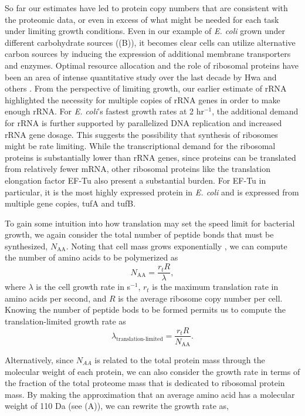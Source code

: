 So far our estimates have led to protein copy numbers that are consistent with
the proteomic data, or even in excess of what might be needed for each task
under limiting growth conditions. Even in our example of \textit{E. coli} grown
under different carbohydrate sources ((B)), it becomes clear
cells can utilize alternative carbon sources by inducing the expression of
additional membrane transporters and enzymes. Optimal resource allocation and
the role of ribosomal proteins have been an area of intense quantitative study
over the last decade by Hwa and others \citep{scott2010, hui2015}. From the
perspective of limiting growth, our earlier estimate of rRNA highlighted the
necessity for multiple copies of rRNA genes in order to make enough rRNA. For
\textit{E. coli}'s fastest growth rates at 2 hr$^{-1}$, the additional  demand
for rRNA is further supported by parallelized DNA replication and increased rRNA
gene dosage. This suggests the possibility that synthesis of ribosomes might
be rate limiting. While the transcriptional demand for the ribosomal proteins
is substantially lower than rRNA genes, since proteins can be translated from
relatively fewer mRNA, other ribosomal proteins like the translation elongation
factor EF-Tu also present a substantial burden. For EF-Tu  in particular, it is
the most highly expressed protein in \textit{E. coli} and is expressed from
multiple gene copies, tufA and tufB.

To gain some intuition into how translation may set the speed limit for bacterial
growth, we again consider the total number of peptide bonds that must be synthesized,
$N_\text{AA}$. Noting that cell mass grows exponentially \citep{godin2010}, we
can compute the number of amino acids to be polymerized as \begin{equation}
N_\text{AA} = \frac{r_t R}{\lambda}, \end{equation} where $\lambda$ is the cell
growth rate in s$^{-1}$, $r_t$ is the maximum translation rate in amino acids
per second, and $R$ is the average ribosome copy number per cell. Knowing the
number of peptide bods to be formed permits us to compute the
translation-limited growth rate as \begin{equation}
\lambda_\text{translation-limited} = \frac{r_t R}{N_\text{AA}}.
\end{equation}

Alternatively, since $N_{AA}$ is related to the total protein mass through the
molecular weight of each protein, we can also consider the growth rate in terms
of the fraction of the total proteome mass that is dedicated to ribosomal
protein mass. By making the approximation that an average amino acid has a
molecular weight of 110 Da (see (A)), we can rewrite the
growth rate as,

